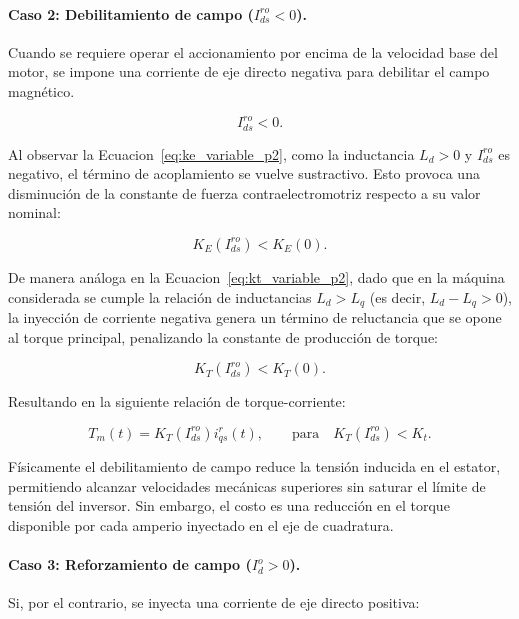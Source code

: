 \documentclass[10pt,a4paper]{article}
\begin{document}
\paragraph{Caso 2: Debilitamiento de campo ($I_{ds}^{ro}<0$).}
Cuando se requiere operar el accionamiento por encima de la velocidad base del motor, se impone una corriente de eje directo negativa para debilitar el campo magnético.

\begin{equation*}
    I_{ds}^{ro}<0.
\end{equation*}

Al observar la Ecuacion~\eqref{eq:ke_variable_p2}, como la inductancia $L_d > 0$ y $I_{ds}^{ro}$ es negativo,
el término de acoplamiento se vuelve sustractivo. Esto provoca una disminución de la constante de fuerza contraelectromotriz respecto a su valor nominal:

\begin{equation*}
    K_E(I_{ds}^{ro})<K_E(0).
\end{equation*}

De manera análoga en la Ecuacion~\eqref{eq:kt_variable_p2}, 
dado que en la máquina considerada se cumple la relación de inductancias $L_d > L_q$ (es decir, $L_d - L_q > 0$),
la inyección de corriente negativa genera un término de reluctancia que se opone al torque principal, 
penalizando la constante de producción de torque:

\begin{equation*}
    K_T(I_{ds}^{ro})<K_T(0).
\end{equation*}

Resultando en la siguiente relación de torque-corriente:

\begin{equation*}
    T_m(t)=K_T(I_{ds}^{ro})i_{qs}^{r}(t),
    \qquad \text{para} \quad
    K_T(I_{ds}^{ro})<K_t.
\end{equation*}

Físicamente el debilitamiento de campo reduce la tensión inducida en el estator, 
permitiendo alcanzar velocidades mecánicas superiores sin saturar el límite de tensión del inversor. 
Sin embargo, el costo es una reducción en el torque disponible por cada amperio inyectado en el eje de cuadratura.


\paragraph{Caso 3: Reforzamiento de campo ($I_d^o>0$).}
Si, por el contrario, se inyecta una corriente de eje directo positiva:
\end{document}
